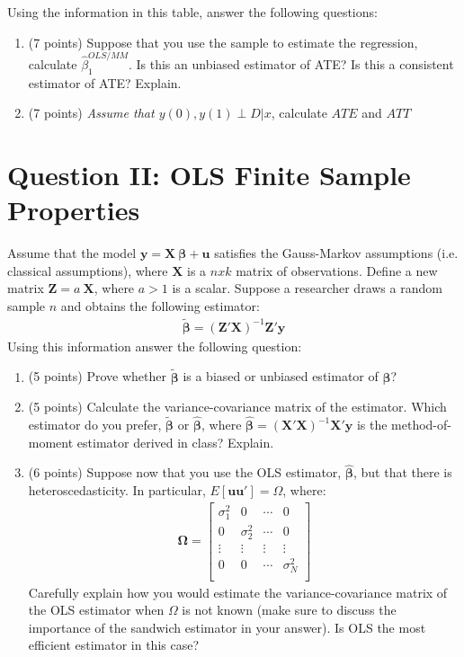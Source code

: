 \documentclass[letterpaper,12pt]{article}
\theoremstyle{dotlessS}
\begin{document}
Using the information in this table, answer the following questions:
\begin{enumerate}[label=(\alph*)]
\item (7 points) Suppose that you use the sample to estimate the regression, calculate $\hat{\beta}_1^{OLS/MM}$. Is this an unbiased estimator of ATE? Is this a consistent estimator of ATE? Explain.
\item (7 points) \textit{Assume that $y(0),y(1) \perp D|x$}, calculate $ATE$ and $ATT$
\end{enumerate}

\section*{Question II: OLS Finite Sample Properties
}
Assume that the model $\bm{y}=\bm{X} \: \bm{\beta}+\bm{u}$ satisfies the Gauss-Markov assumptions (i.e. classical assumptions), where $\bm{X}$ is a $n x k$ matrix of observations. Define a new matrix $\bm{Z}=a \: \bm{X}$, where $a>1$ is a scalar. Suppose a researcher draws a random sample $n$ and obtains the following estimator:
\begin{eqnarray*}
\bm{\widetilde{\beta}}=(\bm{Z}'\bm{X})^{-1}\bm{Z}'\bm{y}
\end{eqnarray*}
Using this information answer the following question:
\begin{enumerate}[label=(\alph*)]  
\vspace{0.11in}
\item (5 points) Prove whether $\bm{\widetilde{\beta}}$ is a biased or unbiased estimator of $\bm{\beta}$? 
\vspace{0.11in}
\item (5 points) Calculate the variance-covariance matrix of the estimator. Which estimator do you prefer, $\bm{\widetilde{\beta}}$ or $\bm{\hat{\beta}}$, where $\bm{\hat{\beta}}=(\bm{X}'\bm{X})^{-1}\bm{X}'\bm{y}$ is the method-of-moment estimator derived in class? Explain.
\vspace{0.11in}
\item (6 points) Suppose now that you use the OLS estimator, $\bm{\hat{\beta}}$, but that there is heteroscedasticity. In particular, $E[\bm{u}\bm{u}']=\Omega$, where:
\begin{eqnarray*}
\bm{\Omega}=
 \begin{bmatrix}
    \sigma^2_1 & 0  & \cdots &0        \\
     0           & \sigma^2_2  & \cdots &0 \\
     \vdots  &\vdots           &\vdots &\vdots \\ 
      0           & 0  & \cdots &  \sigma^2_N  \\
\end{bmatrix}
\end{eqnarray*}
Carefully explain how you would estimate the variance-covariance matrix of the OLS estimator when $\Omega$ is not known (make sure to discuss the importance of the sandwich estimator in your answer). Is OLS the most efficient estimator in this case?   
\end{enumerate}
\end{document}
